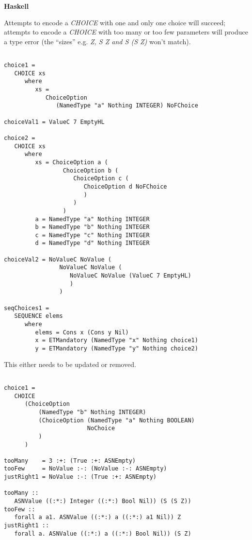 \documentclass{article}
\begin{document}
{\bf Haskell}

Attempts to encode a {\em CHOICE} with one and only one choice will 
succeed; attempts to encode a {\em CHOICE} with too many or too few
parameters will produce a type error (the ``sizes'' e.g. {\em Z, S Z and S (S Z)} won't match).

\begin{lstlisting}[frame=single]

choice1 = 
   CHOICE xs 
      where
         xs = 
            ChoiceOption 
               (NamedType "a" Nothing INTEGER) NoFChoice

choiceVal1 = ValueC 7 EmptyHL

choice2 = 
   CHOICE xs
      where
         xs = ChoiceOption a (
                 ChoiceOption b (
                    ChoiceOption c (
                       ChoiceOption d NoFChoice
                       )
                    )
                 )
         a = NamedType "a" Nothing INTEGER
         b = NamedType "b" Nothing INTEGER
         c = NamedType "c" Nothing INTEGER
         d = NamedType "d" Nothing INTEGER

choiceVal2 = NoValueC NoValue (
                NoValueC NoValue (
                   NoValueC NoValue (ValueC 7 EmptyHL)
                   )
                )

seqChoices1 = 
   SEQUENCE elems
      where
         elems = Cons x (Cons y Nil)
         x = ETMandatory (NamedType "x" Nothing choice1)
         y = ETMandatory (NamedType "y" Nothing choice2)

\end{lstlisting}

This either needs to be updated or removed.

\begin{lstlisting}[frame=single]

choice1 = 
   CHOICE 
      (ChoiceOption 
          (NamedType "b" Nothing INTEGER) 
          (ChoiceOption (NamedType "a" Nothing BOOLEAN) 
                        NoChoice
          )
      )

tooMany    = 3 :+: (True :+: ASNEmpty)
tooFew     = NoValue :-: (NoValue :-: ASNEmpty)
justRight1 = NoValue :-: (True :+: ASNEmpty)

tooMany :: 
   ASNValue ((:*:) Integer ((:*:) Bool Nil)) (S (S Z))
tooFew :: 
   forall a a1. ASNValue ((:*:) a ((:*:) a1 Nil)) Z
justRight1 :: 
   forall a. ASNValue ((:*:) a ((:*:) Bool Nil)) (S Z)

\end{lstlisting}
\end{document}
